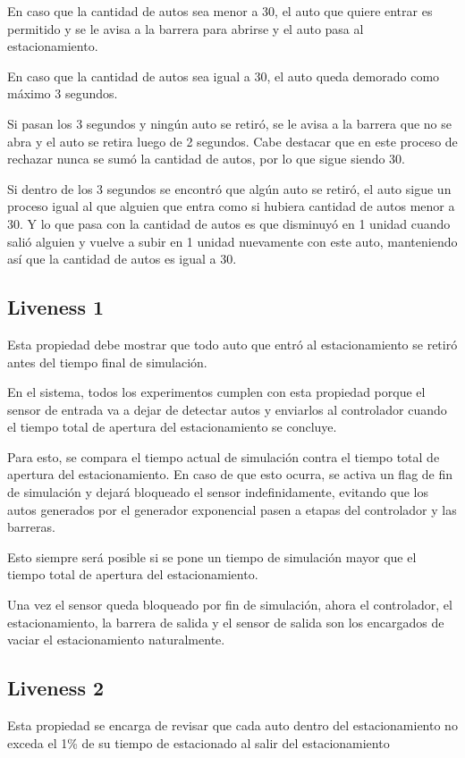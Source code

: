 \documentclass[12pt]{article}
\begin{document}
En caso que la cantidad de autos sea menor a 30, el auto que quiere entrar es permitido y se le avisa a la barrera para abrirse y el auto pasa al estacionamiento.

En caso que la cantidad de autos sea igual a 30, el auto queda demorado como máximo 3 segundos. 

Si pasan los 3 segundos y ningún auto se retiró, se le avisa a la barrera que no se abra y el auto se retira luego de 2 segundos. Cabe destacar que en este proceso de rechazar nunca se sumó la cantidad de autos, por lo que sigue siendo 30.

Si dentro de los 3 segundos se encontró que algún auto se retiró, el auto sigue un proceso igual al que alguien que entra como si hubiera cantidad de autos menor a 30. Y lo que pasa con la cantidad de autos es que disminuyó en 1 unidad cuando salió alguien y vuelve a subir en 1 unidad nuevamente con este auto, manteniendo así que la cantidad de autos es igual a 30.

\subsection{Liveness 1}
Esta propiedad debe mostrar que todo auto que entró al estacionamiento se retiró antes del tiempo final de simulación.

En el sistema, todos los experimentos cumplen con esta propiedad porque el sensor de entrada va a dejar de detectar autos y enviarlos al controlador cuando el tiempo total de apertura del estacionamiento se concluye.

Para esto, se compara el tiempo actual de simulación contra el tiempo total de apertura del estacionamiento. En caso de que esto ocurra, se activa un flag de fin de simulación y dejará bloqueado el sensor indefinidamente, evitando que los autos generados por el generador exponencial pasen a etapas del controlador y las barreras.

Esto siempre será posible si se pone un tiempo de simulación mayor que el tiempo total de apertura del estacionamiento.

Una vez el sensor queda bloqueado por fin de simulación, ahora el controlador, el estacionamiento, la barrera de salida y el sensor de salida son los encargados de vaciar el estacionamiento naturalmente.

\subsection{Liveness 2}
Esta propiedad se encarga de revisar que cada auto dentro del estacionamiento no exceda el 1\% de su tiempo de estacionado al salir del estacionamiento 
\end{document}
